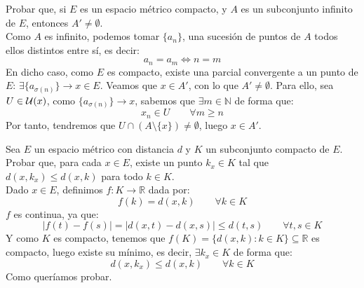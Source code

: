 \begin{ejercicio}
Probar que, si \( E \) es un espacio métrico compacto, y \( A \) es un subconjunto infinito de \( E \), entonces \( A' \neq \emptyset \).\\

\noindent
Como $A$ es infinito, podemos tomar $\{a_n\}$, una sucesión de puntos de $A$ todos ellos distintos entre sí, es decir:
\begin{equation*}
    a_n = a_m \Longleftrightarrow n = m
\end{equation*}
En dicho caso, como $E$ es compacto, existe una parcial convergente a un punto de $E$: $\exists \{a_{\sigma(n)}\}\rightarrow x\in E$. Veamos que $x\in A'$, con lo que $A' \neq \emptyset $. Para ello, sea $U\in \mathcal{U}(x)$, como $\{a_{\sigma(n)}\} \rightarrow x$, sabemos que $\exists m\in \mathbb{N}$ de forma que:
\begin{equation*}
    x_n \in U \qquad \forall m\geq n
\end{equation*}
Por tanto, tendremos que $U\cap (A\setminus \{x\}) \neq \emptyset $, luego $x\in A'$.
\end{ejercicio}

\begin{ejercicio}
Sea \( E \) un espacio métrico con distancia \( d \) y \( K \) un subconjunto compacto de \( E \). Probar que, para cada \( x \in E \), existe un punto \( k_x \in K \) tal que \( d(x, k_x) \leq d(x, k) \) para todo \( k \in K \).\\

\noindent
Dado $x\in E$, definimos $f:K\rightarrow \mathbb{R}$ dada por:
\begin{equation*}
    f(k) = d(x,k) \qquad \forall k\in K
\end{equation*}
$f$ es continua, ya que:
\begin{equation*}
    |f(t) - f(s)| = |d(x,t) - d(x,s)| \leq d(t,s) \qquad \forall t,s\in K
\end{equation*}
Y como $K$ es compacto, tenemos que $f(K) = \{d(x,k) : k\in K\} \subseteq \mathbb{R}$ es compacto, luego existe su mínimo, es decir, $\exists k_x \in K$ de forma que:
\begin{equation*}
    d(x,k_x) \leq d(x,k) \qquad \forall k\in K
\end{equation*}
Como queríamos probar.
\end{ejercicio}

